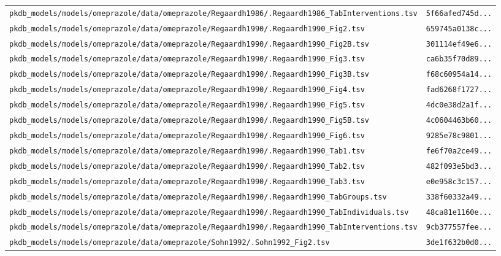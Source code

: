 \documentclass{article}
\begin{document}
\begin{longtable}{ll}
\texttt{pkdb\_models/models/omeprazole/data/omeprazole/Regaardh1986/.Regaardh1986\_TabInterventions.tsv} & \texttt{5f66afed745d...} \\
\texttt{pkdb\_models/models/omeprazole/data/omeprazole/Regaardh1990/.Regaardh1990\_Fig2.tsv} & \texttt{659745a0138c...} \\
\texttt{pkdb\_models/models/omeprazole/data/omeprazole/Regaardh1990/.Regaardh1990\_Fig2B.tsv} & \texttt{301114ef49e6...} \\
\texttt{pkdb\_models/models/omeprazole/data/omeprazole/Regaardh1990/.Regaardh1990\_Fig3.tsv} & \texttt{ca6b35f70d89...} \\
\texttt{pkdb\_models/models/omeprazole/data/omeprazole/Regaardh1990/.Regaardh1990\_Fig3B.tsv} & \texttt{f68c60954a14...} \\
\texttt{pkdb\_models/models/omeprazole/data/omeprazole/Regaardh1990/.Regaardh1990\_Fig4.tsv} & \texttt{fad6268f1727...} \\
\texttt{pkdb\_models/models/omeprazole/data/omeprazole/Regaardh1990/.Regaardh1990\_Fig5.tsv} & \texttt{4dc0e38d2a1f...} \\
\texttt{pkdb\_models/models/omeprazole/data/omeprazole/Regaardh1990/.Regaardh1990\_Fig5B.tsv} & \texttt{4c0604463b60...} \\
\texttt{pkdb\_models/models/omeprazole/data/omeprazole/Regaardh1990/.Regaardh1990\_Fig6.tsv} & \texttt{9285e78c9801...} \\
\texttt{pkdb\_models/models/omeprazole/data/omeprazole/Regaardh1990/.Regaardh1990\_Tab1.tsv} & \texttt{fe6f70a2ce49...} \\
\texttt{pkdb\_models/models/omeprazole/data/omeprazole/Regaardh1990/.Regaardh1990\_Tab2.tsv} & \texttt{482f093e5bd3...} \\
\texttt{pkdb\_models/models/omeprazole/data/omeprazole/Regaardh1990/.Regaardh1990\_Tab3.tsv} & \texttt{e0e958c3c157...} \\
\texttt{pkdb\_models/models/omeprazole/data/omeprazole/Regaardh1990/.Regaardh1990\_TabGroups.tsv} & \texttt{338f60332a49...} \\
\texttt{pkdb\_models/models/omeprazole/data/omeprazole/Regaardh1990/.Regaardh1990\_TabIndividuals.tsv} & \texttt{48ca81e1160e...} \\
\texttt{pkdb\_models/models/omeprazole/data/omeprazole/Regaardh1990/.Regaardh1990\_TabInterventions.tsv} & \texttt{9cb377557fee...} \\
\texttt{pkdb\_models/models/omeprazole/data/omeprazole/Sohn1992/.Sohn1992\_Fig2.tsv} & \texttt{3de1f632b0d0...} \\

\end{longtable}
\end{document}
